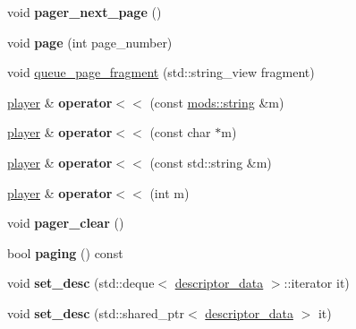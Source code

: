 \begin{DoxyCompactItemize}
void {\bfseries pager\+\_\+next\+\_\+page} ()
\item 
\mbox{\label{classmods_1_1player_ac86a2bee53a0931b3ebed1ec18385ae0}} 
void {\bfseries page} (int page\+\_\+number)
\item 
void \hyperlink{classmods_1_1player_a43832fcf34ddb3e7968a26703d3250cd}{queue\+\_\+page\+\_\+fragment} (std\+::string\+\_\+view fragment)
\item 
\mbox{\label{classmods_1_1player_a09dabbd02a2418ca90a96f715e69bb68}} 
\hyperlink{classmods_1_1player}{player} \& {\bfseries operator$<$$<$} (const \hyperlink{structmods_1_1string}{mods\+::string} \&m)
\item 
\mbox{\label{classmods_1_1player_ac6c0d4b3f9047117ef797698df4b7306}} 
\hyperlink{classmods_1_1player}{player} \& {\bfseries operator$<$$<$} (const char $\ast$m)
\item 
\mbox{\label{classmods_1_1player_ad09209c13b4f58e1bcd51897f8bb1feb}} 
\hyperlink{classmods_1_1player}{player} \& {\bfseries operator$<$$<$} (const std\+::string \&m)
\item 
\mbox{\label{classmods_1_1player_a5c60061a3e82ade30f6b3ba5d94f7227}} 
\hyperlink{classmods_1_1player}{player} \& {\bfseries operator$<$$<$} (int m)
\item 
\mbox{\label{classmods_1_1player_a09de19290c2191f95d8e07937c76dc1d}} 
void {\bfseries pager\+\_\+clear} ()
\item 
\mbox{\label{classmods_1_1player_a2ee6cf11d335225a4e2e035d419b8076}} 
bool {\bfseries paging} () const
\item 
\mbox{\label{classmods_1_1player_ad8b5e48c762c234c99406dbb9d4510bb}} 
void {\bfseries set\+\_\+desc} (std\+::deque$<$ \hyperlink{structmods_1_1descriptor__data}{descriptor\+\_\+data} $>$\+::iterator it)
\item 
\mbox{\label{classmods_1_1player_a573f41de9bcd357412059bf016ebde78}} 
void {\bfseries set\+\_\+desc} (std\+::shared\+\_\+ptr$<$ \hyperlink{structmods_1_1descriptor__data}{descriptor\+\_\+data} $>$ it)

\end{DoxyCompactItemize}
